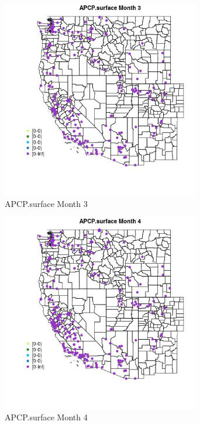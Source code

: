 \begin{figure} 
\centering  
\includegraphics[width=0.77\textwidth]{Code_Outputs/Report_ML_input_PM25_Step4_part_e_de_duplicated_aveswNAs_MapObsMo3APCPsurface.jpg} 
\caption{\label{fig:Report_ML_input_PM25_Step4_part_e_de_duplicated_aveswNAsMapObsMo3APCPsurface}APCP.surface Month 3} 
\end{figure} 
 

\begin{figure} 
\centering  
\includegraphics[width=0.77\textwidth]{Code_Outputs/Report_ML_input_PM25_Step4_part_e_de_duplicated_aveswNAs_MapObsMo4APCPsurface.jpg} 
\caption{\label{fig:Report_ML_input_PM25_Step4_part_e_de_duplicated_aveswNAsMapObsMo4APCPsurface}APCP.surface Month 4} 
\end{figure} 
 

